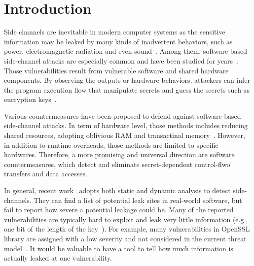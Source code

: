 \section{Introduction}
Side channels are inevitable in modern computer systems as the sensitive information 
may be leaked by many kinds of inadvertent behaviors, 
such as power, electromagnetic radiation and even sound~\cite{}. 
Among them, software-based side-channel attacks are especially common 
and have been studied for years~\cite{}. 
Those vulnerabilities result from vulnerable software and shared hardware components.
By observing the outputs or hardware behaviors, attackers can
infer the program execution flow that manipulate secrets and 
guess the secrets such as encryption keys~\cite{}.

Various countermeasures have been proposed to defend against 
software-based side-channel attacks. In term of hardware level,
those methods includes reducing shared resources, adopting oblivious RAM and 
transactinal memory~\cite{182946,203878,217537}. 
However, in addition to runtime overheads, those methods are limited to specific hardwares. 
Therefore, a more promising and universal direction are software countermeasures, which
detect and eliminate secret-dependent control-flwo transfers and data accesses.

In general, recent work~\cite{203878} adopts both static and dynamic analysis
to detect side-channels.
They can find a list of potential leak sites in real-world software, 
but fail to report how severe a potential leakage could be. 
Many of the reported vulnerabilities are typically hard to exploit
and leak very little information (e.g., one bit of the length of the key~\cite{203878}).  
For example, many vulnerabilities in OpenSSL library are assigned with a low severity 
and not considered 
in the current threat model~\cite{https://www.openssl.org/policies/secpolicy.html}. 
It would be valuable to have a tool to tell how much information is actually leaked 
at one vulnerability.

